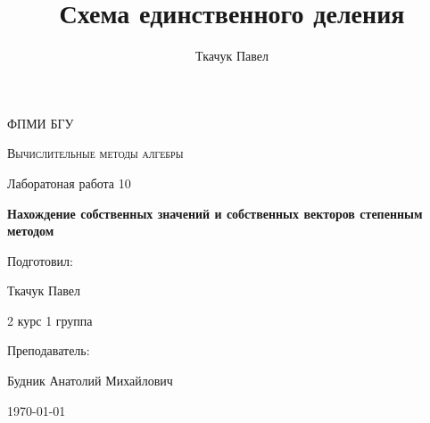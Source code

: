 \documentclass[11.4pt]{article}
\author{Ткачук Павел}
\title{Схема единственного деления}
\begin{document}
	\begin{titlepage}
		
		\centering
		{\scshape\LARGE ФПМИ БГУ \par}
		\vfill
		\begin{flushleft}
		{\scshape\Large Вычислительные методы алгебры\par Лаборатоная работа 10\par}
		\vspace{1cm}
		{\huge\bfseries Нахождение собственных значений и собственных векторов степенным методом\par}
		\end{flushleft}
		\vspace{10cm}
		\begin{flushright}
		\large
		Подготовил:\par
		Ткачук Павел\par
		2 курс 1 группа\par
		\vspace{0.5cm}
		Преподаватель:\par
		Будник Анатолий Михайлович
		\end{flushright}
		
		\vfill
		{\large \today}
	\end{titlepage}
\end{document}
